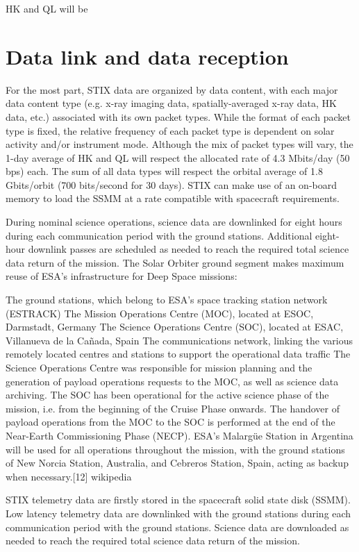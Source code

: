 \documentclass{aa}
\begin{document}
 HK and QL will be




\section{Data link and data reception}
For the most part, STIX data are organized by data content, with each major data content
type (e.g. x-ray imaging data, spatially-averaged x-ray data, HK data, etc.) associated with
its own packet types. While the format of each packet type is fixed, the relative frequency of
each packet type is dependent on solar activity and/or instrument mode. Although the mix
of packet types will vary, the 1-day average of HK and QL will respect the allocated rate of
4.3 Mbits/day (50 bps) each. The sum of all data types will respect the orbital average of 1.8
Gbits/orbit (700 bits/second for 30 days). STIX can make use of an on-board memory to
load the SSMM at a rate compatible with spacecraft requirements.

During nominal science operations, science data are downlinked for eight hours during each
communication period with the ground stations. Additional eight-hour downlink passes are
scheduled as needed to reach the required total science data return of the mission.
The Solar Orbiter ground segment makes maximum reuse of ESA's infrastructure for Deep Space missions:

The ground stations, which belong to ESA's space tracking station network (ESTRACK)
The Mission Operations Centre (MOC), located at ESOC, Darmstadt, Germany
The Science Operations Centre (SOC), located at ESAC, Villanueva de la Cañada, Spain
The communications network, linking the various remotely located centres and stations to support the operational data traffic
The Science Operations Centre was responsible for mission planning and the generation of payload operations requests to the MOC, as well as science data archiving. The SOC has been operational for the active science phase of the mission, i.e. from the beginning of the Cruise Phase onwards. The handover of payload operations from the MOC to the SOC is performed at the end of the Near-Earth Commissioning Phase (NECP). ESA's Malargüe Station in Argentina will be used for all operations throughout the mission, with the ground stations of New Norcia Station, Australia, and Cebreros Station, Spain, acting as backup when necessary.[12] wikipedia

STIX telemetry data are firstly stored in the spacecraft solid state disk (SSMM).
Low latency telemetry data are downlinked  with the ground stations during each communication period with the ground stations.
Science data are downloaded  as needed to reach the required total science data return of the mission.
\end{document}
